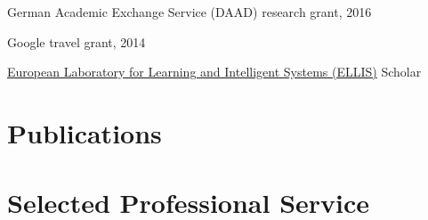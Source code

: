 \documentclass[margin,line]{res}
\begin{document}
\begin{resume}
\vspace*{-2.5mm}
German Academic Exchange Service (DAAD) research grant, 2016

\vspace*{-2.5mm}
Google travel grant, 2014

\vspace*{-2.5mm}
\href{https://ellis.eu/}{European Laboratory for Learning and Intelligent Systems (ELLIS)} Scholar

\section{\sc Publications}




\section{\sc Selected Professional Service}


\end{resume}
\end{document}
